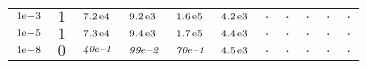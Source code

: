 \begin{tiny}
\begin{tabular}{@{$\;$}c@{$\;$}|@{$\;$}c@{$\;$}@{$\;$}c@{$\;$}@{$\;$}c@{$\;$}@{$\;$}c@{$\;$}@{$\;$}c@{$\;$}|@{$\;$}c@{$\;$}@{$\;$}c@{$\;$}@{$\;$}c@{$\;$}@{$\;$}c@{$\;$}@{$\;$}c@{$\;$}}
$\scriptstyle1\!\mathrm{\hspace{0.10em}e}-3$ & $\scriptstyle1$ & $\scriptstyle7.2\mathrm{\hspace{0.10em}e}4$ & $\scriptstyle9.2\mathrm{\hspace{0.10em}e}3$ & $\scriptstyle1.6\mathrm{\hspace{0.10em}e}5$ & $\scriptstyle4.2\mathrm{\hspace{0.10em}e}3$ & $\scriptstyle.$ & $\scriptstyle.$ & $\scriptstyle.$ & $\scriptstyle.$ & $\scriptstyle.$\\ 
$\scriptstyle1\!\mathrm{\hspace{0.10em}e}-5$ & $\scriptstyle1$ & $\scriptstyle7.3\mathrm{\hspace{0.10em}e}4$ & $\scriptstyle9.4\mathrm{\hspace{0.10em}e}3$ & $\scriptstyle1.7\mathrm{\hspace{0.10em}e}5$ & $\scriptstyle4.4\mathrm{\hspace{0.10em}e}3$ & $\scriptstyle.$ & $\scriptstyle.$ & $\scriptstyle.$ & $\scriptstyle.$ & $\scriptstyle.$\\ 
$\scriptstyle1\!\mathrm{\hspace{0.10em}e}-8$ & $\scriptstyle0$ & $\scriptstyle\textit{40}\hspace{0.00em}e\textit{--1}$ & $\scriptstyle\textit{99}\hspace{0.00em}e\textit{--2}$ & $\scriptstyle\textit{70}\hspace{0.00em}e\textit{--1}$ & $\scriptstyle4.5\mathrm{\hspace{0.10em}e}3$ & $\scriptstyle.$ & $\scriptstyle.$ & $\scriptstyle.$ & $\scriptstyle.$ & $\scriptstyle.$\\ 
\end{tabular} 
\end{tiny} 
